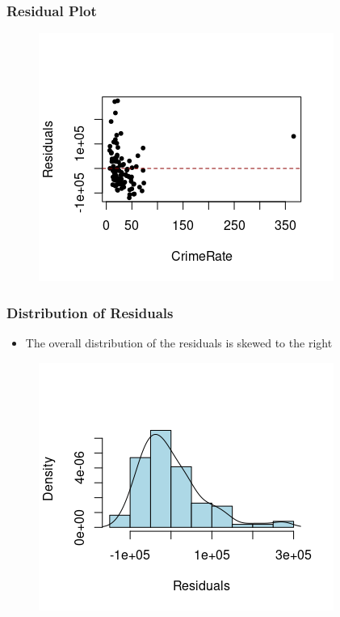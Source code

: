 \documentclass[compress]{beamer}
\begin{document}
\begin{frame}
\frametitle{\sc Residual Plot}
    \begin{figure}[!ht]
		\centering
		\includegraphics[scale=0.9]{figs8/residual.png}
	\end{figure}
\end{frame}

\begin{frame}
	\frametitle{\sc Distribution of Residuals}
	\begin{itemize}
		\item The overall distribution of the residuals is skewed to the right
    \end{itemize}	
    \begin{figure}[!ht]
		\centering
		\includegraphics[scale=0.8]{figs8/residuals-density.png}
	\end{figure}	
\end{frame}
\end{document}
